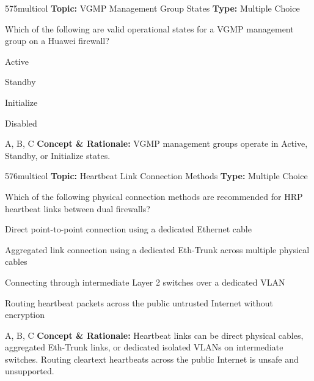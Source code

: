 \begin{qcard}{575}{multicol}
\textcolor{darkslate!75}{\small\textbf{Topic:} VGMP Management Group States \hfill \textbf{Type:} Multiple Choice}\vspace{0.4em}\par
Which of the following are valid operational states for a VGMP management group on a Huawei firewall?
\begin{qoptions}
\item Active
\item Standby
\item Initialize
\item Disabled
\end{qoptions}
\end{qcard}
\nopagebreak
\begin{explainbox}{A, B, C}
\textbf{Concept \& Rationale:} VGMP management groups operate in Active, Standby, or Initialize states.
\end{explainbox}

\begin{qcard}{576}{multicol}
\textcolor{darkslate!75}{\small\textbf{Topic:} Heartbeat Link Connection Methods \hfill \textbf{Type:} Multiple Choice}\vspace{0.4em}\par
Which of the following physical connection methods are recommended for HRP heartbeat links between dual firewalls?
\begin{qoptions}
\item Direct point-to-point connection using a dedicated Ethernet cable
\item Aggregated link connection using a dedicated Eth-Trunk across multiple physical cables
\item Connecting through intermediate Layer 2 switches over a dedicated VLAN
\item Routing heartbeat packets across the public untrusted Internet without encryption
\end{qoptions}
\end{qcard}
\nopagebreak
\begin{explainbox}{A, B, C}
\textbf{Concept \& Rationale:} Heartbeat links can be direct physical cables, aggregated Eth-Trunk links, or dedicated isolated VLANs on intermediate switches. Routing cleartext heartbeats across the public Internet is unsafe and unsupported.
\end{explainbox}

